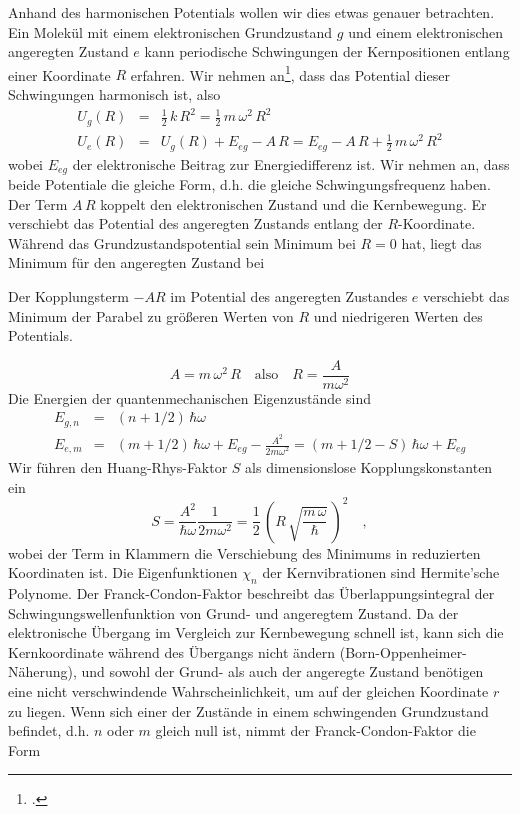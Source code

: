Anhand des harmonischen Potentials wollen wir dies etwas genauer betrachten. Ein Molekül mit einem elektronischen Grundzustand $g$ und einem elektronischen angeregten Zustand $e$ kann periodische Schwingungen der Kernpositionen entlang einer Koordinate $R$ erfahren. 
Wir nehmen an\footcite{Kuzmany}, dass das Potential dieser Schwingungen harmonisch ist, also
\begin{eqnarray}
 U_g(R) &=& \frac{1}{2} \, k\, R^2 = \frac{1}{2} \, m \, \omega^2 \, R^2 \\
  U_e(R) &=&  U_g(R) + E_{eg} - A \, R = E_{eg}  - A \, R + \frac{1}{2} \, m \, \omega^2 \, R^2 
 \end{eqnarray}
wobei $E_{eg}$ der elektronische Beitrag zur Energiedifferenz ist. Wir nehmen an, dass beide Potentiale die gleiche Form, d.h. die gleiche Schwingungsfrequenz haben. Der Term $A \, R$ koppelt den elektronischen Zustand und die Kernbewegung. Er verschiebt das Potential des angeregten Zustands entlang der $R$-Koordinate. Während das Grundzustandspotential sein Minimum bei $R=0$ hat, liegt das Minimum für den angeregten Zustand bei
%
\begin{marginfigure}[-35mm]
\caption{Der Kopplungsterm $-A R$ im Potential des angeregten Zustandes $e$ verschiebt das Minimum der Parabel zu größeren Werten von $R$ und niedrigeren Werten des Potentials. }
\end{marginfigure}
%
%
\begin{equation}
 A = m \, \omega^2 \,  R	 \quad \text{also} \quad R = \frac{A}{m \omega^2}
\end{equation}
Die Energien der quantenmechanischen Eigenzustände sind 
\begin{eqnarray}
  E_{g, n} &=&  (n + 1/2) \, \hbar \omega  \\
  E_{e, m} &=&  (m + 1/2) \, \hbar \omega  +  E_{eg} - \frac{A^2}{2 m \omega^2} =
   (m + 1/2 - S) \, \hbar \omega  +  E_{eg}  \nonumber
\end{eqnarray}
Wir führen den Huang-Rhys-Faktor $S$ als dimensionslose Kopplungskonstanten ein
\begin{equation}
 S = \frac{A^2}{\hbar \omega} \frac{1}{2 m \omega^2}
 = \frac{1}{2} \, \left( R \, \sqrt{\frac{m \, \omega}{\hbar}}\, \right)^2 \quad ,
\end{equation}
wobei der Term in Klammern die Verschiebung des Minimums in reduzierten Koordinaten ist.
Die Eigenfunktionen $\chi_n$ der Kernvibrationen sind Hermite'sche Polynome. Der Franck-Condon-Faktor beschreibt das Überlappungsintegral der Schwingungswellenfunktion von Grund- und angeregtem Zustand. Da der elektronische Übergang im Vergleich zur Kernbewegung schnell ist, kann sich die Kernkoordinate während des Übergangs nicht ändern (Born-Oppenheimer-Näherung), und sowohl der Grund- als auch der angeregte Zustand benötigen eine nicht verschwindende Wahrscheinlichkeit, um auf der gleichen Koordinate $r$ zu liegen. Wenn sich einer der Zustände in einem schwingenden Grundzustand befindet, d.h. $n$ oder $m$ gleich null ist, nimmt der Franck-Condon-Faktor die Form
